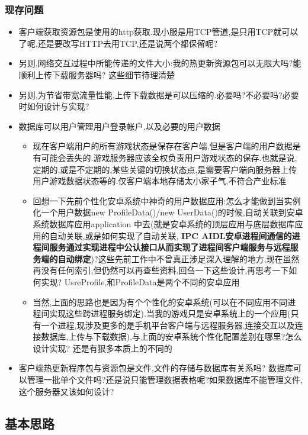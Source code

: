 \documentclass[9pt, b5paper]{article}
\begin{document}
\subsubsection{现存问题}
\label{sec-4-1-3}
\begin{itemize}
\item 客户端获取资源包是使用的http获取.现小服是用TCP管道,是只用TCP就可以了呢,还是要改写HTTP去用TCP,还是说两个都保留呢?
\item 另则,网络交互过程中所能传递的文件大小:我的热更新资源包可以无限大吗?能顺利上传下载服务器吗? 这些细节待理清楚
\item 另则,为节省带宽流量性能,上传下载数据是可以压缩的.必要吗?不必要吗?必要时如何设计与实现?
\item 数据库可以用户管理用户登录帐户,以及必要的用户数据
\begin{itemize}
\item 现在客户端用户的所有游戏状态是保存在客户端.但是客户端的用户数据是有可能会丢失的.游戏服务器应该全权负责用户游戏状态的保存.也就是说,定期的,或是不定期的,某些关键的切换状态点,是需要客户端向服务器上传用户游戏数据状态等的.仅客户端本地存储太小家子气,不符合产业标准
\item 回想一下先前个性化安卓系统中神奇的用户数据应用:怎么才能做到当实例化一个用户数据new ProfileData()/new UserData()的时候,自动关联到安卓系统数据库应用application 中去(就是安卓系统的顶层应用与底层数据库应用的自动关联,或是如何实现了自动关联, \textbf{IPC AIDL安卓进程间通信的进程间服务通过实现进程中公认接口从而实现了进程间客户端服务与远程服务端的自动绑定})?这些先前工作中不曾真正涉足深入理解的地方,现在虽然再没有任何索引,但仍然可以再查些资料,回刍一下这些设计,再思考一下如何实现? UsreProfile,和ProfileData是两个不同的安卓应用
\item 当然,上面的思路也是因为有个个性化的安卓系统(可以在不同应用不同进程间实现这些跨进程服务绑定).当我的游戏只是安卓系统上的一个应用(只有一个进程,现涉及更多的是手机平台客户端与远程服务器,连接交互以及连接数据库,上传与下载数据),与上面的安卓系统个性化配置差别在哪里?怎么设计实现? 还是有狠多本质上的不同的
\end{itemize}
\item 客户端热更新程序包与资源包是文件,文件的存储与数据库有关系吗? 数据库可以管理一批单个文件吗?还是说只能管理数据表格呢?如果数据库不能管理文件,这个服务器又该如何设计?
\end{itemize}
\subsection{基本思路}
\label{sec-4-2}
\end{document}
